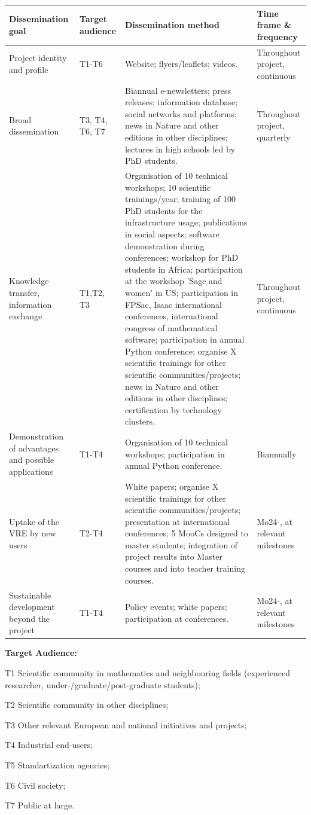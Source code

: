 \begin{supertabular}{|m{3cm}|m{1cm}| m{8cm} | m{2cm}|}
\hline
Dissemination goal &
Target audience&
Dissemination method &
Time frame \& frequency  \\\hline
Project identity and profile &
T1-T6
&
Website; flyers/leaflets; videos.
& 
Throughout project, continuous \\\hline
Broad dissemination &
T3, T4, T6, T7 
&
Biannual e-newsletters; press releases; information database; social networks and platforms; news  in Nature and other editions in other disciplines; lectures in high schools led by PhD students.
& 
Throughout project, quarterly \\\hline
Knowledge transfer, information exchange&
T1,T2, T3
&

Organisation of 10 technical workshops; 10 scientific trainings/year; training of 100 PhD students for the infrastructure usage; publications in social aspects; software demonstration during conferences; workshop for PhD students in Africa; participation at the workshop 'Sage and women' in US; participation in FPSac, Isaac international conferences, international congress of mathematical software; participation in annual Python conference; organise X scientific trainings for other scientific communities/projects; news  in Nature and other editions in other disciplines; certification by technology clusters.
& 
Throughout project, continuous  \\\hline
Demonstration of advantages and possible applications &
T1-T4
&
Organisation of 10 technical workshops; participation in annual Python conference.
& 
Biannually \\\hline
Uptake of the VRE by new users &
T2-T4
&
White papers; organise X scientific trainings for other scientific communities/projects; presentation at international conferences; 5 MooCs designed to master students; integration of project results into Master courses and into teacher training courses.
& 
Mo24-, at relevant milestones \\\hline
Sustainable development beyond the project &
T1-T4
&
Policy events; white papers; participation at conferences.
& 
Mo24-, at relevant milestones \\\hline
\end{supertabular}

{\bf Target Audience:}
\begin{compactenum}
\item[T1] Scientific community in mathematics and neighbouring fields (experienced researcher, under-/graduate/post-graduate students);
\item[T2] Scientific community in other disciplines;
\item[T3] Other relevant European and national initiatives and projects;
\item[T4] Industrial end-users;
\item[T5] Standartization agencies;
\item[T6] Civil society;
\item[T7] Public at large.
\end{compactenum}

